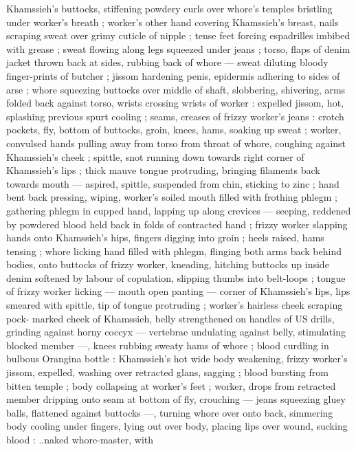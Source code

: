 {Khamssieh's buttocks, stiffening powdery curls over whore's temples 
bristling under worker's breath ; worker's other hand covering 
Khamssieh's breast, nails scraping sweat over grimy cuticle of nipple 
; tense feet forcing espadrilles imbibed with grease ; sweat flowing 
along legs squeezed under jeans ; torso, flaps of denim jacket 
thrown back at sides, rubbing back of whore --- sweat diluting 
bloody finger-prints of butcher ; jissom hardening penis, epidermis 
adhering to sides of arse ; whore squeezing buttocks over middle of 
shaft, slobbering, shivering, arms folded back against torso, wrists 
crossing wrists of worker : expelled jissom, hot, splashing previous 
spurt cooling ; seams, creases of frizzy worker's jeans : crotch 
pockets, fly, bottom of buttocks, groin, knees, hams, soaking up 
sweat ; worker, convulsed hands pulling away from torso from throat 
of whore, coughing against Khamssieh's cheek ; spittle, snot 
running down towards right corner of Khamssieh's lips ; thick mauve 
tongue protruding, bringing filaments back towards mouth --- 
aspired, spittle, suspended from chin, sticking to zinc ; hand bent 
back pressing, wiping, worker's soiled mouth filled with frothing 
phlegm ; gathering phlegm in cupped hand, lapping up along 
crevices --- seeping, reddened by powdered blood held back in folds 
of contracted hand ; frizzy worker slapping hands onto Khamssieh's 
hips, fingers digging into groin ; heels raised, hams tensing ; whore 
licking hand filled with phlegm, flinging both arms back behind 
bodies, onto buttocks of frizzy worker, kneading, hitching buttocks 
up inside denim softened by labour of copulation, slipping thumbs 
into belt-loops ; tongue of frizzy worker licking --- mouth open 
panting --- corner of Khamssieh's lips, lips smeared with spittle, tip 
of tongue protruding ; worker's hairless cheek scraping pock- 
marked cheek of Khamssieh, belly strengthened on handles of US 
drills, grinding against horny coccyx --- vertebrae undulating against 
belly, stimulating blocked member ---, knees rubbing sweaty hams of 
whore ; blood curdling in bulbous Orangina bottle : Khamssieh's hot 
wide body weakening, frizzy worker's jissom, expelled, washing over 
retracted glans, sagging ; blood bursting from bitten temple ; body 
collapsing at worker's feet ; worker, drops from retracted member 
dripping onto seam at bottom of fly, crouching --- jeans squeezing 
gluey balls, flattened against buttocks ---, turning whore over onto 
back, simmering body cooling under fingers, lying out over body, 
placing lips over wound, sucking blood : {\gl}..naked whore-master, with 
}
